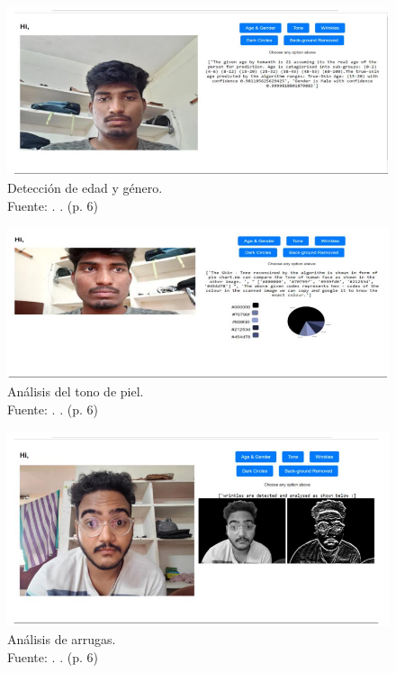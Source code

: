 \begin{figure}[!ht]
	\begin{center}
		\includegraphics[width=1\textwidth]{2/figures/softres1.png}
		\caption[Detección de edad y género]{Detección de edad y género.\\
			Fuente: \cite{Tamilkodi2024}. . (p. 6)}
		\label{2:fig8}
	\end{center}
\end{figure}

\begin{figure}[!ht]
	\begin{center}
		\includegraphics[width=1\textwidth]{2/figures/softres2.png}
		\caption[Análisis del tono de piel]{Análisis del tono de piel.\\
			Fuente: \cite{Tamilkodi2024}. . (p. 6)}
		\label{2:fig9}
	\end{center}
\end{figure}

\begin{figure}[!ht]
	\begin{center}
		\includegraphics[width=1\textwidth]{2/figures/softres3.png}
		\caption[Análisis de arrugas]{Análisis de arrugas.\\
			Fuente: \cite{Tamilkodi2024}. . (p. 6)}
		\label{2:fig10}
	\end{center}
\end{figure}

